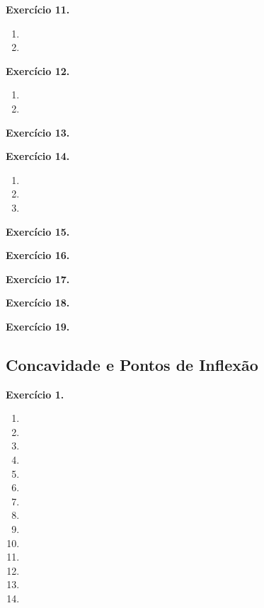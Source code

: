 \documentclass[12pt,a4paper]{article}
\begin{document}
\vspace{0.5cm}
\noindent\textbf{Exercício 11.}
\begin{enumerate}
    \renewcommand{\theenumi}{\alph{enumi}}
    \renewcommand{\labelenumi}{\theenumi)}
    \item 
    \item 
\end{enumerate}

\vspace{0.5cm}
\noindent\textbf{Exercício 12.}
\begin{enumerate}
    \renewcommand{\theenumi}{\alph{enumi}}
    \renewcommand{\labelenumi}{\theenumi)}
    \item 
    \item 
\end{enumerate}

\vspace{0.5cm}
\noindent\textbf{Exercício 13.}

\vspace{0.5cm}
\noindent\textbf{Exercício 14.}
\begin{enumerate}
    \renewcommand{\theenumi}{\alph{enumi}}
    \renewcommand{\labelenumi}{\theenumi)}
    \item 
    \item 
    \item 
\end{enumerate}

\vspace{0.5cm}
\noindent\textbf{Exercício 15.}

\vspace{0.5cm}
\noindent\textbf{Exercício 16.}

\vspace{0.5cm}
\noindent\textbf{Exercício 17.}

\vspace{0.5cm}
\noindent\textbf{Exercício 18.}

\vspace{0.5cm}
\noindent\textbf{Exercício 19.}

\subsection{Concavidade e Pontos de Inflexão}

\vspace{0.5cm}
\noindent\textbf{Exercício 1.}
\begin{enumerate}
    \renewcommand{\theenumi}{\alph{enumi}}
    \renewcommand{\labelenumi}{\theenumi)}
    \item 
    \item 
    \item 
    \item 
    \item 
    \item 
    \item 
    \item 
    \item 
    \item 
    \item 
    \item 
    \item 
    \item 
\end{enumerate}
\end{document}
